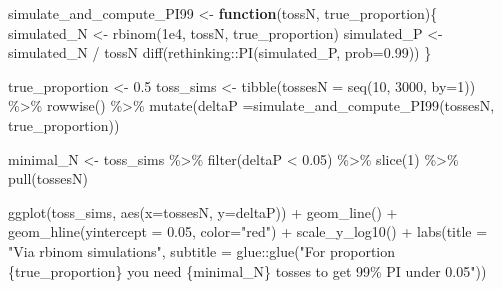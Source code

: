 \documentclass[
]{book}
\newenvironment{Shaded}{\begin{snugshade}}{\end{snugshade}}
\newcommand{\AttributeTok}[1]{\textcolor[rgb]{0.77,0.63,0.00}{#1}}
\newcommand{\ControlFlowTok}[1]{\textcolor[rgb]{0.13,0.29,0.53}{\textbf{#1}}}
\newcommand{\DecValTok}[1]{\textcolor[rgb]{0.00,0.00,0.81}{#1}}
\newcommand{\FloatTok}[1]{\textcolor[rgb]{0.00,0.00,0.81}{#1}}
\newcommand{\FunctionTok}[1]{\textcolor[rgb]{0.00,0.00,0.00}{#1}}
\newcommand{\NormalTok}[1]{#1}
\newcommand{\OtherTok}[1]{\textcolor[rgb]{0.56,0.35,0.01}{#1}}
\newcommand{\SpecialCharTok}[1]{\textcolor[rgb]{0.00,0.00,0.00}{#1}}
\newcommand{\StringTok}[1]{\textcolor[rgb]{0.31,0.60,0.02}{#1}}
\begin{document}
\begin{Shaded}
\begin{Highlighting}[]
\NormalTok{simulate\_and\_compute\_PI99 }\OtherTok{\textless{}{-}} \ControlFlowTok{function}\NormalTok{(tossN, true\_proportion)\{}
\NormalTok{  simulated\_N }\OtherTok{\textless{}{-}} \FunctionTok{rbinom}\NormalTok{(}\FloatTok{1e4}\NormalTok{, tossN, true\_proportion)}
\NormalTok{  simulated\_P }\OtherTok{\textless{}{-}}\NormalTok{ simulated\_N }\SpecialCharTok{/}\NormalTok{ tossN}
  \FunctionTok{diff}\NormalTok{(rethinking}\SpecialCharTok{::}\FunctionTok{PI}\NormalTok{(simulated\_P, }\AttributeTok{prob=}\FloatTok{0.99}\NormalTok{))}
\NormalTok{\}}

\NormalTok{true\_proportion }\OtherTok{\textless{}{-}} \FloatTok{0.5}
\NormalTok{toss\_sims }\OtherTok{\textless{}{-}} 
  \FunctionTok{tibble}\NormalTok{(}\AttributeTok{tossesN =} \FunctionTok{seq}\NormalTok{(}\DecValTok{10}\NormalTok{, }\DecValTok{3000}\NormalTok{, }\AttributeTok{by=}\DecValTok{1}\NormalTok{)) }\SpecialCharTok{\%\textgreater{}\%}
  \FunctionTok{rowwise}\NormalTok{() }\SpecialCharTok{\%\textgreater{}\%}
  \FunctionTok{mutate}\NormalTok{(}\AttributeTok{deltaP =}\FunctionTok{simulate\_and\_compute\_PI99}\NormalTok{(tossesN, true\_proportion))}

\NormalTok{minimal\_N }\OtherTok{\textless{}{-}} 
\NormalTok{  toss\_sims }\SpecialCharTok{\%\textgreater{}\%}
  \FunctionTok{filter}\NormalTok{(deltaP }\SpecialCharTok{\textless{}} \FloatTok{0.05}\NormalTok{) }\SpecialCharTok{\%\textgreater{}\%}
  \FunctionTok{slice}\NormalTok{(}\DecValTok{1}\NormalTok{) }\SpecialCharTok{\%\textgreater{}\%}
  \FunctionTok{pull}\NormalTok{(tossesN)}

\FunctionTok{ggplot}\NormalTok{(toss\_sims, }\FunctionTok{aes}\NormalTok{(}\AttributeTok{x=}\NormalTok{tossesN, }\AttributeTok{y=}\NormalTok{deltaP)) }\SpecialCharTok{+} 
  \FunctionTok{geom\_line}\NormalTok{() }\SpecialCharTok{+} 
  \FunctionTok{geom\_hline}\NormalTok{(}\AttributeTok{yintercept =} \FloatTok{0.05}\NormalTok{, }\AttributeTok{color=}\StringTok{"red"}\NormalTok{) }\SpecialCharTok{+} 
  \FunctionTok{scale\_y\_log10}\NormalTok{() }\SpecialCharTok{+} 
  \FunctionTok{labs}\NormalTok{(}\AttributeTok{title =} \StringTok{"Via rbinom simulations"}\NormalTok{,}
       \AttributeTok{subtitle =}\NormalTok{ glue}\SpecialCharTok{::}\FunctionTok{glue}\NormalTok{(}\StringTok{"For proportion \{true\_proportion\} you need \{minimal\_N\} tosses to get 99\% PI under 0.05"}\NormalTok{))}
\end{Highlighting}
\end{Shaded}
\end{document}
